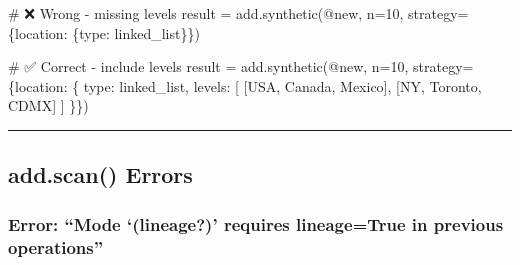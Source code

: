 \documentclass[
  letterpaper,
]{scrbook}
\newenvironment{Shaded}{\begin{snugshade}}{\end{snugshade}}
\newcommand{\CommentTok}[1]{\textcolor[rgb]{0.37,0.37,0.37}{#1}}
\newcommand{\DecValTok}[1]{\textcolor[rgb]{0.68,0.00,0.00}{#1}}
\newcommand{\NormalTok}[1]{\textcolor[rgb]{0.00,0.23,0.31}{#1}}
\newcommand{\OperatorTok}[1]{\textcolor[rgb]{0.37,0.37,0.37}{#1}}
\newcommand{\StringTok}[1]{\textcolor[rgb]{0.13,0.47,0.30}{#1}}
\begin{document}
\begin{Shaded}
\begin{Highlighting}[]
\CommentTok{\# ❌ Wrong {-} missing levels}
\NormalTok{result }\OperatorTok{=}\NormalTok{ add.synthetic(}\StringTok{\textquotesingle{}@new\textquotesingle{}}\NormalTok{, n}\OperatorTok{=}\DecValTok{10}\NormalTok{, }
\NormalTok{                       strategy}\OperatorTok{=}\NormalTok{\{}\StringTok{\textquotesingle{}location\textquotesingle{}}\NormalTok{: \{}\StringTok{\textquotesingle{}type\textquotesingle{}}\NormalTok{: }\StringTok{\textquotesingle{}linked\_list\textquotesingle{}}\NormalTok{\}\})}

\CommentTok{\# ✅ Correct {-} include levels}
\NormalTok{result }\OperatorTok{=}\NormalTok{ add.synthetic(}\StringTok{\textquotesingle{}@new\textquotesingle{}}\NormalTok{, n}\OperatorTok{=}\DecValTok{10}\NormalTok{, }
\NormalTok{                       strategy}\OperatorTok{=}\NormalTok{\{}\StringTok{\textquotesingle{}location\textquotesingle{}}\NormalTok{: \{}
                           \StringTok{\textquotesingle{}type\textquotesingle{}}\NormalTok{: }\StringTok{\textquotesingle{}linked\_list\textquotesingle{}}\NormalTok{,}
                           \StringTok{\textquotesingle{}levels\textquotesingle{}}\NormalTok{: [}
\NormalTok{                               [}\StringTok{\textquotesingle{}USA\textquotesingle{}}\NormalTok{, }\StringTok{\textquotesingle{}Canada\textquotesingle{}}\NormalTok{, }\StringTok{\textquotesingle{}Mexico\textquotesingle{}}\NormalTok{],}
\NormalTok{                               [}\StringTok{\textquotesingle{}NY\textquotesingle{}}\NormalTok{, }\StringTok{\textquotesingle{}Toronto\textquotesingle{}}\NormalTok{, }\StringTok{\textquotesingle{}CDMX\textquotesingle{}}\NormalTok{]}
\NormalTok{                           ]}
\NormalTok{                       \}\})}
\end{Highlighting}
\end{Shaded}

\begin{center}\rule{0.5\linewidth}{0.5pt}\end{center}

\subsection{add.scan() Errors}\label{add.scan-errors}

\subsubsection{\texorpdfstring{Error: ``Mode `(\textbf{lineage?})'
requires lineage=True in previous
operations''}{Error: ``Mode `(lineage?)' requires lineage=True in previous operations''}}\label{error-mode-lineage-requires-lineagetrue-in-previous-operations}
\end{document}
